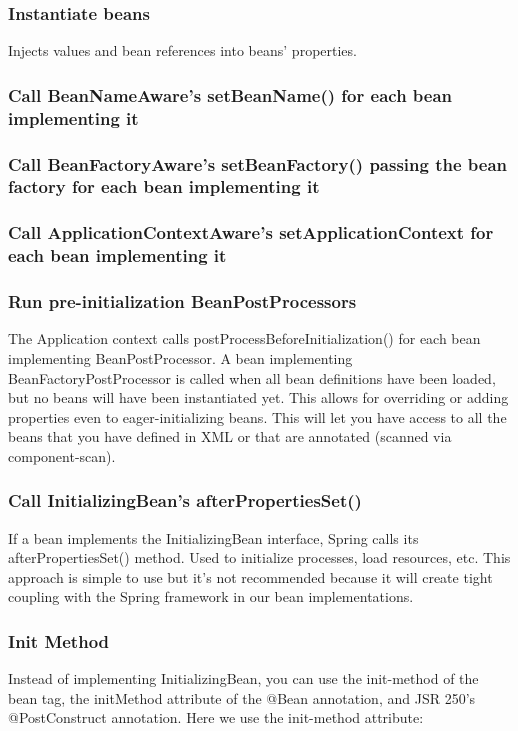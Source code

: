 \documentclass{scrartcl}
\begin{document}
\subsubsection{Instantiate beans}
    Injects values and bean references into beans’ properties.

\subsubsection{Call BeanNameAware’s setBeanName() for each bean implementing it}

\subsubsection{Call BeanFactoryAware’s setBeanFactory() passing the bean factory for each bean implementing it}

\subsubsection{Call ApplicationContextAware’s setApplicationContext for each bean implementing it}

\subsubsection{Run pre-initialization BeanPostProcessors}
    The Application context calls postProcessBeforeInitialization() for each bean implementing BeanPostProcessor.
    A bean implementing BeanFactoryPostProcessor is called when all bean definitions have been loaded, but no beans will have been instantiated yet. This allows for overriding or adding properties even to eager-initializing beans. This will let you have access to all the beans that you have defined in XML or that are annotated (scanned via component-scan).

\subsubsection{Call InitializingBean’s afterPropertiesSet()}
    If a bean implements the InitializingBean interface, Spring calls its afterPropertiesSet() method. Used to initialize processes,  load resources, etc. This approach is simple to use but it’s not recommended because it will create tight coupling with the Spring framework in our bean implementations.

\subsubsection{Init Method}
    Instead of implementing InitializingBean, you can use the init-method of the bean tag, the initMethod attribute of the @Bean annotation, and JSR 250's @PostConstruct  annotation.
    Here we use the init-method attribute:
\end{document}
